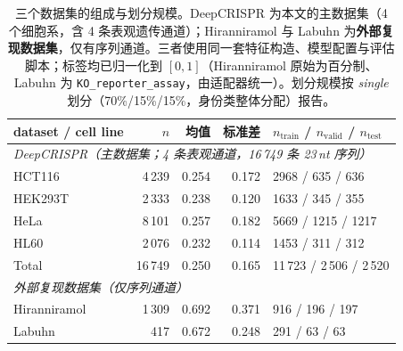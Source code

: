 \begin{table}[htbp]
\centering
\footnotesize
\caption{三个数据集的组成与划分规模。DeepCRISPR 为本文的主数据集（4 个细胞系，含 4 条表观遗传通道）；Hiranniramol 与 Labuhn 为\textbf{外部复现数据集}，仅有序列通道。三者使用同一套特征构造、模型配置与评估脚本；标签均已归一化到 $[0,1]$（Hiranniramol 原始为百分制、Labuhn 为 \texttt{KO\_reporter\_assay}，由适配器统一）。划分规模按 \emph{single} 划分（70\%/15\%/15\%，身份类整体分配）报告。}
\label{tab:dataset}
\begin{tabular}{lrrrl}
\toprule
dataset / cell line & $n$ & 均值 & 标准差 & $n_{\text{train}}$ / $n_{\text{valid}}$ / $n_{\text{test}}$ \\
\midrule
\multicolumn{5}{l}{\textit{DeepCRISPR（主数据集；4 条表观通道，16\,749 条 23\,nt 序列）}} \\
HCT116 & 4\,239 & 0.254 & 0.172 & 2968 / 635 / 636 \\
HEK293T & 2\,333 & 0.238 & 0.120 & 1633 / 345 / 355 \\
HeLa & 8\,101 & 0.257 & 0.182 & 5669 / 1215 / 1217 \\
HL60 & 2\,076 & 0.232 & 0.114 & 1453 / 311 / 312 \\
\midrule
Total & 16\,749 & 0.250 & 0.165 & 11\,723 / 2\,506 / 2\,520 \\
\midrule
\multicolumn{5}{l}{\textit{外部复现数据集（仅序列通道）}} \\
Hiranniramol & 1\,309 & 0.692 & 0.371 & 916 / 196 / 197 \\
Labuhn & 417 & 0.672 & 0.248 & 291 / 63 / 63 \\
\bottomrule
\end{tabular}
\end{table}
